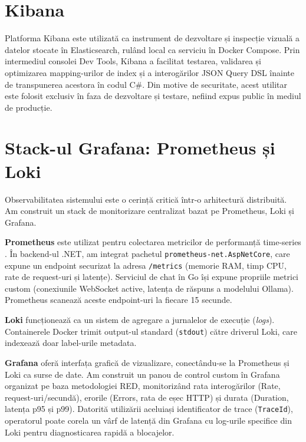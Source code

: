 \section{Kibana}

Platforma Kibana este utilizată ca instrument de dezvoltare și inspecție vizuală a datelor stocate în Elasticsearch, rulând local ca serviciu în Docker Compose. Prin intermediul consolei Dev Tools, Kibana a facilitat testarea, validarea și optimizarea mapping-urilor de index și a interogărilor JSON Query DSL înainte de transpunerea acestora în codul C\#. Din motive de securitate, acest utilitar este folosit exclusiv în faza de dezvoltare și testare, nefiind expus public în mediul de producție.

\section{Stack-ul Grafana: Prometheus și Loki}

Observabilitatea sistemului este o cerință critică într-o arhitectură distribuită. Am construit un stack de monitorizare centralizat bazat pe Prometheus, Loki și Grafana.

\textbf{Prometheus} este utilizat pentru colectarea metricilor de performanță time-series \cite{prometheus2026metrics}. În backend-ul .NET, am integrat pachetul \texttt{prometheus-net.AspNetCore}, care expune un endpoint securizat la adresa \texttt{/metrics} (memorie RAM, timp CPU, rate de request-uri și latențe). Serviciul de chat în Go își expune propriile metrici custom (conexiunile WebSocket active, latența de răspuns a modelului Ollama). Prometheus scanează aceste endpoint-uri la fiecare 15 secunde.

\textbf{Loki} funcționează ca un sistem de agregare a jurnalelor de execuție (\textit{logs}). Containerele Docker trimit output-ul standard (\texttt{stdout}) către driverul Loki, care indexează doar label-urile metadata.

\textbf{Grafana} oferă interfața grafică de vizualizare, conectându-se la Prometheus și Loki ca surse de date. Am construit un panou de control custom în Grafana organizat pe baza metodologiei RED, monitorizând rata interogărilor (Rate, request-uri/secundă), erorile (Errors, rata de eșec HTTP) și durata (Duration, latența p95 și p99). Datorită utilizării aceluiași identificator de trace (\texttt{TraceId}), operatorul poate corela un vârf de latență din Grafana cu log-urile specifice din Loki pentru diagnosticarea rapidă a blocajelor.

